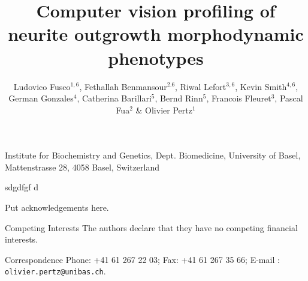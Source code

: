 \documentclass{nature}
\title{Computer vision profiling of neurite outgrowth morphodynamic phenotypes}
\author{Ludovico Fusco$^{1,6}$, Fethallah Benmansour$^{2. 6}$, Riwal Lefort$^{3, 6}$, Kevin Smith$^{4, 6}$, German Gonzales$^4$,  Catherina Barillari$^5$, Bernd Rinn$^5$, Francois Fleuret$^3$, Pascal Fua$^2$  \& Olivier Pertz$^1$}
\begin{document}
\maketitle

\begin{affiliations}
 \item Institute for Biochemistry and Genetics, Dept. Biomedicine, University of Basel, Mattenstrasse 28, 4058 Basel, Switzerland
 \item 
 \item 
 \item 
 \item 
 \item 
\end{affiliations}


sdgdfgf d




\begin{results}







\end{results}




%
%


\begin{addendum}
 \item Put acknowledgements here.
 \item[Competing Interests] The authors declare that they have no
competing financial interests.
 \item[Correspondence] Phone: +41 61 267 22 03; Fax: +41 61 267 35 66; E-mail : \texttt{olivier.pertz@unibas.ch}.
\end{addendum}

\end{document}
